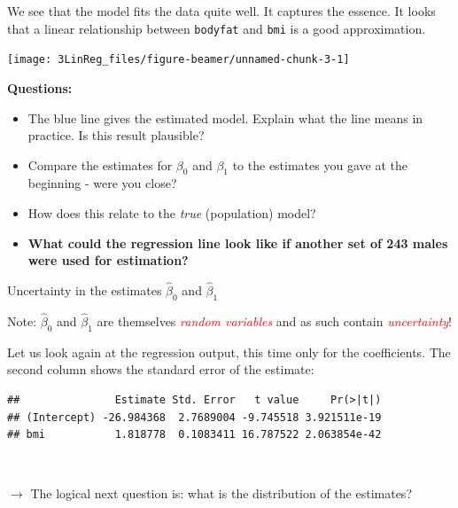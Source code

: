 \documentclass[
  10pt,
  ignorenonframetext,
]{beamer}
\newenvironment{Shaded}{\begin{snugshade}}{\end{snugshade}}
\newcommand{\FunctionTok}[1]{\textcolor[rgb]{0.13,0.29,0.53}{\textbf{#1}}}
\newcommand{\NormalTok}[1]{#1}
\newcommand{\SpecialCharTok}[1]{\textcolor[rgb]{0.81,0.36,0.00}{\textbf{#1}}}
\begin{document}
\begin{frame}[fragile]
We see that the model fits the data quite well. It captures the essence.
It looks that a linear relationship between \texttt{bodyfat} and
\texttt{bmi} is a good approximation.

\begin{center}\texttt{[image: 3LinReg\_files/figure-beamer/unnamed-chunk-3-1]} \end{center}
\end{frame}

\begin{frame}
\textbf{Questions:}

\begin{itemize}
\item
  The blue line gives the estimated model. Explain what the line means
  in practice. Is this result plausible?
\item
  Compare the estimates for \(\beta_0\) and \(\beta_1\) to the estimates
  you gave at the beginning - were you close?
\item
  How does this relate to the \emph{true} (population) model?
\item
  \textbf{What could the regression line look like if another set of 243
  males were used for estimation?}
\end{itemize}
\end{frame}

\begin{frame}[fragile]
\begin{block}{Uncertainty in the estimates \(\hat\beta_0\) and
\(\hat\beta_1\)}
\protect\hypertarget{uncertainty-in-the-estimates-hatbeta_0-and-hatbeta_1}{}
\vspace{2mm}

Note: \(\hat\beta_0\) and \(\hat\beta_1\) are themselves
\emph{\textcolor{red}{random variables}} and as such contain
\emph{\textcolor{red}{uncertainty}}!

\vspace{4mm}

Let us look again at the regression output, this time only for the
coefficients. The second column shows the standard error of the
estimate: \vspace{2mm}

\scriptsize

\begin{Shaded}
\end{Shaded}

\begin{verbatim}
##               Estimate Std. Error   t value     Pr(>|t|)
## (Intercept) -26.984368  2.7689004 -9.745518 3.921511e-19
## bmi           1.818778  0.1083411 16.787522 2.063854e-42
\end{verbatim}

\normalsize

\(~\)

\(\rightarrow\) The logical next question is: what is the distribution
of the estimates?
\end{block}
\end{frame}
\end{document}
